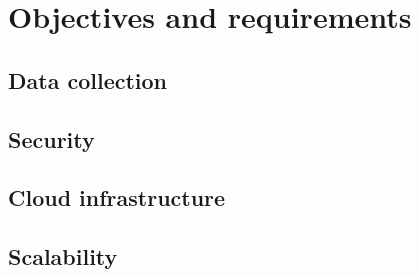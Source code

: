 \chapter{Objectives and requirements}
\label{cap:requirements}

\section{Data collection}
\section{Security}
\section{Cloud infrastructure}
\section{Scalability}

